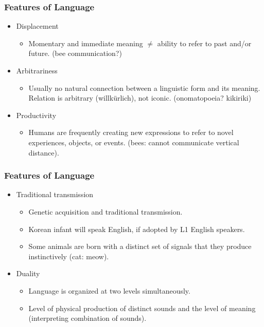 \documentclass[12pt, table]{beamer}
\begin{document}
\begin{frame}
\frametitle{Features of Language}
\begin{itemize}
\item Displacement
\begin{itemize}
\item Momentary and immediate meaning $\neq$ ability to refer to past and/or future. (bee communication?)
\end{itemize}
\item Arbitrariness
\begin{itemize}
\item Usually no natural connection between a linguistic form and its meaning. Relation is arbitrary (willk{\"u}rlich), not iconic. (onomatopoeia? kikiriki)
\end{itemize}
\item Productivity
\begin{itemize}
\item Humans are frequently creating new expressions to refer to novel experiences, objects, or events. (bees: cannot communicate vertical distance).
\end{itemize}
\end{itemize}
\end{frame}

\begin{frame}
\frametitle{Features of Language}
\begin{itemize}
\item Traditional transmission
\begin{itemize}
\item Genetic acquisition and traditional transmission. 
\item Korean infant will speak English, if adopted by L1 English speakers.
\item Some animals are born with a distinct set of signals that they produce instinctively (cat: meow).
\end{itemize}
\item Duality
\begin{itemize}
\item Language is organized at two levels simultaneously. 
\item Level of physical production of distinct sounds and the level of meaning (interpreting combination of sounds).
\end{itemize}
\end{itemize}
\end{frame}
\end{document}
